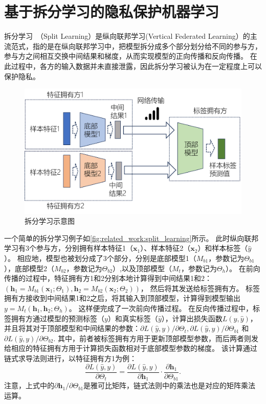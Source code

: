 \section{基于拆分学习的隐私保护机器学习}
%
拆分学习~\cite{vepakomma2018split,poirot2019split}（Split Learning）是纵向联邦学习(Vertical Federated Learning）的主流范式，指的是在纵向联邦学习中，把模型拆分成多个部分划分给不同的参与方，参与方之间相互交换中间结果和梯度，从而实现模型的正向传播和反向传播。
%
在此过程中，各方的输入数据并未直接泄露，因此拆分学习被认为在一定程度上可以保护隐私。

\begin{figure}[h]
    \centering
    \includegraphics[width=0.8\linewidth]{Z_Resources/拆分学习示意图.png}
    \caption{拆分学习示意图}
    \label{fig:related_work:split_learning}
\end{figure}

一个简单的拆分学习例子如\autoref{fig:related_work:split_learning}所示。
%
此时纵向联邦学习有3个参与方，分别拥有样本特征1（$\mathbf x_1$）、样本特征2（$\mathbf x_2$）和样本标签（$\hat y$）。
%
相应地，模型也被划分成了3个部分，分别是底部模型1（$M_{b1}$，参数记为$\Theta_{b1}$），底部模型2（$M_{b2}$，参数记为$\Theta_{b2}$）,以及顶部模型（$M_t$，参数记为$\Theta_h$）。
%
在前向传播的过程中，特征拥有方1和2分别本地计算得到中间结果1和2：
$
    \left(
        \mathbf h_1 = M_{b1}(\mathbf x_1;\Theta_1),
        \mathbf h_2 = M_{b2}(\mathbf x_2;\Theta_2)
    \right)
$，
然后将其发送给标签拥有方。
%
标签拥有方接收到中间结果1和2之后，将其输入到顶部模型，计算得到模型输出$y = M_t(\mathbf h_1, \mathbf h_2; \Theta_h)$。
%
这样便完成了一次前向传播过程。
%
%
在反向传播过程中，标签拥有方通过模型的预测标签（$y$）和真实标签（$\hat y$），计算出损失函数$L(y, \hat y)$，并且将其对于顶部模型和中间结果的参数：${\partial L(\hat y, y)}/{\partial \Theta_t}, {\partial L(\hat y, y)}/{\partial \Theta_{b1}}$ 和 ${\partial L(\hat y, y)}/{\partial \Theta_{b2}}$.
%
其中，前者被标签拥有方用于更新顶部模型参数，而后两者则发给相应的特征拥有方用于计算损失函数相对于底部模型参数的梯度。
%
该计算通过链式求导法则进行，以特征拥有方1为例：
\begin{equation}
    \dfrac{\partial L(\hat y, y)}{\partial \Theta_t} = \dfrac{\partial L(\hat y, y)}{\partial \mathbf h_1}\cdot \dfrac{\partial \mathbf h_1}{\partial \Theta_{b1}}.
\end{equation}
%
注意，上式中的${\partial \mathbf h_1}/{\partial \Theta_{b1}}$是雅可比矩阵，链式法则中的乘法也是对应的矩阵乘法运算。

